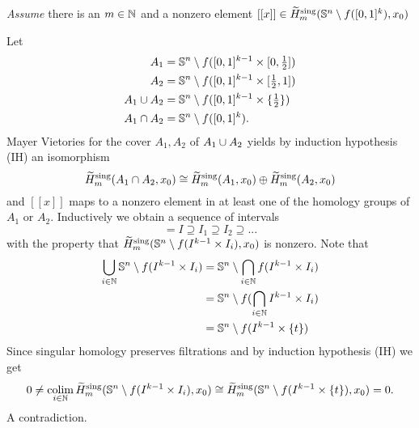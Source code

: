 \begin{sketch}
\begin{enumerate}[(i)]
{\begin{enumerate}
{						\textit{Assume} there is an $m \in \N$ and a nonzero element $[[x]] \in \widetilde{H}_m^\text{sing}(\S^n \setminus f([0,1]^k),x_0)$
						\begin{tab}[1.3cm]
							Let\vspace{-2.2em}
							\begin{align*}
								A_1 &= \S^n \setminus f([0,1]^{k-1}\times[0,\tfrac{1}{2}])\\
								A_2 &= \S^n \setminus f([0,1]^{k-1}\times[\tfrac{1}{2},1])\\
								A_1 \union A_2 &= \S^n \setminus f([0,1]^{k-1}\times\{\tfrac{1}{2}\})\\
								A_1 \intersection A_2 &= \S^n \setminus f([0,1]^k).
							\end{align*}
							Mayer Vietories for the cover $A_1, A_2$ of $A_1 \union A_2$ yields by induction hypothesis (IH) an isomorphism 
							\begin{equation*}
								\widetilde{H}_m^\text{sing}(A_1 \intersection A_2,x_0) \isom \widetilde{H}_m^\text{sing}(A_1,x_0) \oplus \widetilde{H}_m^\text{sing}(A_2,x_0)
							\end{equation*}
							and $[[x]]$ maps to a nonzero element in at least one of the homology groups of $A_1$ or $A_2$.
							Inductively we obtain a sequence of intervals 
							\begin{equation*}
								[0,1] = I \supseteq I_1 \supseteq I_2 \supseteq ... 
							\end{equation*}
							with the property that $\widetilde{H}_m^\text{sing}(\S^n \setminus f(I^{k-1}\times I_i),x_0)$ is nonzero.  Note that
							\begin{align*}
								\Union \limits_{i \in \N} \S^n\setminus f(I^{k-1} \times I_i) &= \S^n \setminus \Intersection \limits_{i \in \N} f(I^{k-1} \times I_i)\\ 
								&= \S^n \setminus f(\Intersection \limits_{i \in \N} I^{k-1} \times I_i)\\
								&= \S^n \setminus f(I^{k-1} \times \{t\})
							\end{align*}
							Since singular homology preserves filtrations and by induction hypothesis (IH) we get
							\begin{equation*}
								0 \neq \colim \limits_{i \in \N} \widetilde{H}_m^\text{sing}(\S^n \setminus f(I^{k-1}\times I_i),x_0) \isom \widetilde{H}_m^\text{sing}(\S^n \setminus f(I^{k-1}\times \{t\}),x_0) = 0.
							\end{equation*}
							A contradiction.
						\end{tab}
}
\end{enumerate}}
\end{enumerate}
\end{sketch}
